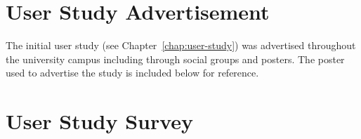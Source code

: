 \chapter{User Study Advertisement}
\label{appendix:user-study-advertisement}

The initial user study (see Chapter~\ref{chap:user-study}) was advertised throughout the university campus including through social groups and posters. The poster used to advertise the study is included below for reference.

\begin{center}
\end{center}

\chapter{User Study Survey}
\label{appendix:user-study-survey}

